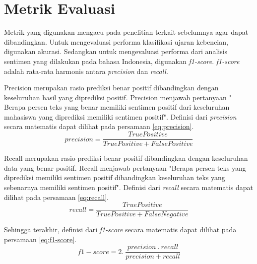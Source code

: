 \section{Metrik Evaluasi}
Metrik yang digunakan mengacu pada penelitian terkait sebelumnya agar dapat dibandingkan. Untuk mengevaluasi performa klasifikasi ujaran kebencian, digunakan akurasi. Sedangkan untuk mengevaluasi performa dari analisis sentimen yang dilakukan pada bahasa Indonesia, digunakan \textit{f1-score}. \textit{f1-score} adalah rata-rata harmonis antara \textit{precision} dan \textit{recall}. 

Precision merupakan rasio prediksi benar positif dibandingkan dengan keseluruhan hasil yang diprediksi positif. Precision menjawab pertanyaan " Berapa persen teks yang benar memiliki sentimen positif dari keseluruhan mahasiswa yang diprediksi memiliki sentimen positif". Definisi dari \textit{precision} secara matematis dapat dilihat pada persamaan \ref{eq:precision}.
\begin{equation}
    precision=\frac{True Positive}{True Positive + False Positive}
    \label{eq:precision}
\end{equation}

Recall merupakan rasio prediksi benar positif dibandingkan dengan keseluruhan data yang benar positif. Recall menjawab pertanyaan "Berapa persen teks yang diprediksi memiliki sentimen positif dibandingkan keseluruhan teks yang sebenarnya memiliki sentimen positif". Definisi dari \textit{recall} secara matematis dapat dilihat pada persamaan \ref{eq:recall}.
\begin{equation}
    recall=\frac{True Positive}{True Positive + False Negative}
    \label{eq:recall}
\end{equation}

Sehingga terakhir, definisi dari \textit{f1-score} secara matematis dapat dilihat pada persamaan \ref{eq:f1-score}. 
\begin{equation}
    f1-score=2.\: \frac{precision\: .\: recall}{precision+recall}
    \label{eq:f1-score}
\end{equation}

